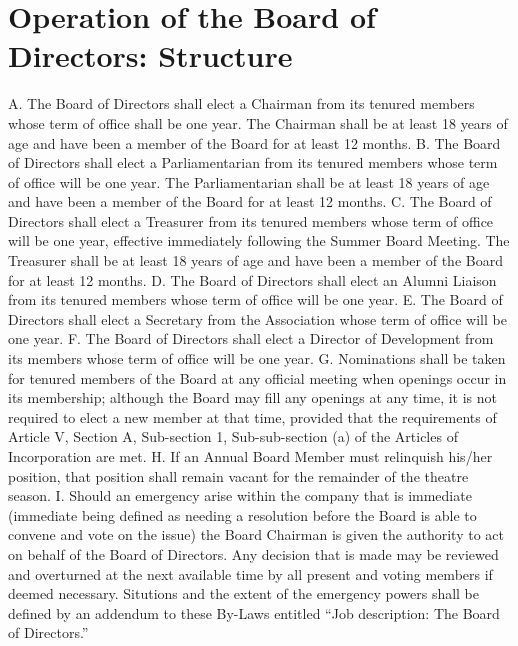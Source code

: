 \documentclass{article}
\begin{document}
\section{Operation of the Board of Directors: Structure}
A.	The Board of Directors shall elect a Chairman from its tenured members whose term of office shall be one year. The Chairman shall be at least 18 years of age and have been a member of the Board for at least 12 months.
B.	The Board of Directors shall elect a Parliamentarian from its tenured members whose term of office will be one year.  The Parliamentarian shall be at least 18 years of age and have been a member of the Board for at least 12 months.
C.	The Board of Directors shall elect a Treasurer from its tenured members whose term of office will be one year, effective immediately following the Summer Board Meeting.  The Treasurer shall be at least 18 years of age and have been a member of the Board for at least 12 months.
D.	The Board of Directors shall elect an Alumni Liaison from its tenured members whose term of office will be one year.
E.	The Board of Directors shall elect a Secretary from the Association whose term of office will be one year.
F.	The Board of Directors shall elect a Director of Development from its members whose term of office will be one year.
G.	Nominations shall be taken for tenured members of the Board at any official meeting when openings occur in its membership; although the Board may fill any openings at any time, it is not required to elect a new member at that time, provided that the requirements of Article V, Section A, Sub-section 1, Sub-sub-section (a) of the Articles of Incorporation are met.
H.	If an Annual Board Member must relinquish his/her position, that position shall remain vacant for the remainder of the theatre season.
I.	Should an emergency arise within the company that is immediate (immediate being defined as needing a resolution before the Board is able to convene and vote on the issue) the Board Chairman is given the authority to act on behalf of the Board of Directors.  Any decision that is made may be reviewed and overturned at the next available time by all present and voting members if deemed necessary.  Situtions and the extent of the emergency powers shall be defined by an addendum to these By-Laws entitled “Job description: The Board of Directors.”
\end{document}
